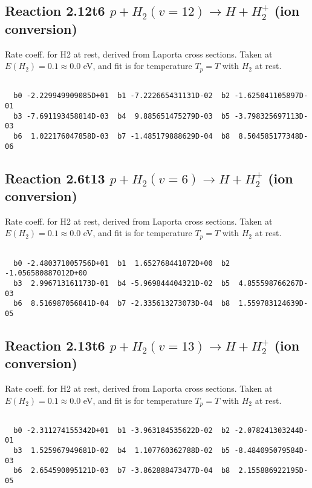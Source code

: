 \documentclass[12pt,dvipdfmx]{article}
\begin{document}
\newpage
\subsection{
Reaction 2.12t6
$ p + H_2(v=12) \rightarrow H + H_2^+$ (ion conversion)
}
Rate coeff. for H2 at rest, derived from Laporta cross sections.
Taken at $E(H_2) = 0.1 \approx 0.0$ eV,  and fit is for temperature $T_p=T$ with $H_2$ at rest.

\begin{small}\begin{verbatim}

  b0 -2.229949909085D+01  b1 -7.222665431131D-02  b2 -1.625041105897D-01
  b3 -7.691193458814D-03  b4  9.885651475279D-03  b5 -3.798325697113D-03
  b6  1.022176047858D-03  b7 -1.485179888629D-04  b8  8.504585177348D-06

\end{verbatim}\end{small}

\newpage
\subsection{
Reaction 2.6t13
$ p + H_2(v=6) \rightarrow H + H_2^+$ (ion conversion)
}
Rate coeff. for H2 at rest, derived from Laporta cross sections.
Taken at $E(H_2) = 0.1 \approx 0.0$ eV,  and fit is for temperature $T_p=T$ with $H_2$ at rest.

\begin{small}\begin{verbatim}

  b0 -2.480371005756D+01  b1  1.652768441872D+00  b2 -1.056580887012D+00
  b3  2.996713161173D-01  b4 -5.969844404321D-02  b5  4.855598766267D-03
  b6  8.516987056841D-04  b7 -2.335613273073D-04  b8  1.559783124639D-05

\end{verbatim}\end{small}

\newpage
\subsection{
Reaction 2.13t6
$ p + H_2(v=13) \rightarrow H + H_2^+$ (ion conversion)
}
Rate coeff. for H2 at rest, derived from Laporta cross sections.
Taken at $E(H_2) = 0.1 \approx 0.0$ eV,  and fit is for temperature $T_p=T$ with $H_2$ at rest.

\begin{small}\begin{verbatim}

  b0 -2.311274155342D+01  b1 -3.963184535622D-02  b2 -2.078241303244D-01
  b3  1.525967949681D-02  b4  1.107760362788D-02  b5 -8.484095079584D-03
  b6  2.654590095121D-03  b7 -3.862888473477D-04  b8  2.155886922195D-05

\end{verbatim}\end{small}
\end{document}
